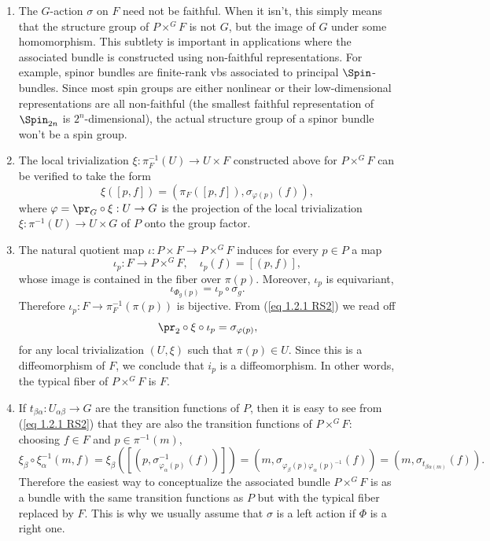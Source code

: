 \begin{rem}\label{rem 1.2.3 RS2}
    \begin{enumerate}
        \item The $G$-action $\sigma$ on $F$ need not be faithful. When it isn't, this simply means that the structure group of $P\times^G F$ is not $G$, but the image of $G$ under some homomorphism. This subtlety is important in applications where the associated bundle is constructed using non-faithful representations. For example, spinor bundles are finite-rank \glspl{vb} associated to principal $\Spin$-bundles. Since most spin groups are either nonlinear or their low-dimensional representations are all non-faithful (the smallest faithful representation of $\Spin_{2n}$ is $2^n$-dimensional), the actual structure group of a spinor bundle won't be a spin group.
        \item The local trivialization $\xi:\pi_F^{-1}(U)\to U\times F$ constructed above for $P\times^G F$ can be verified to take the form
        \[\xi([p,f])=(\pi_F([p,f]),\sigma_{\varphi(p)}(f)),\label{eq 1.2.1 RS2}\]
        where $\varphi=\pr_G\circ \xi:U\to G$ is the projection of the local trivialization $\xi:\pi^{-1}(U)\to U\times G$ of $P$ onto the group factor.
        \item The natural quotient map $\iota:P\times F\to P\times^G F$ induces for every $p\in P$ a map 
        \[\iota_p:F\to P\times^G F,\quad  \iota_p(f)=[(p,f)],\label{eq 1.2.2 RS2 def iotap}\]
        whose image is contained in the fiber over $\pi(p)$.  Moreover, $\iota_p$ is equivariant,
        \[\iota_{\Phi_g(p)}=\iota_p\circ \sigma_g.\label{eq 1.2.3 RS2}\]
        Therefore $\iota_p:F\to \pi_F^{-1}(\pi(p))$ is bijective.  From (\ref{eq 1.2.1 RS2}) we read off
        \[\pr_2\circ\xi\circ \iota_p=\sigma_{\varphi(p)},\]
        for any local trivialization $(U,\xi)$ such that $\pi(p)\in U$. Since this is a diffeomorphism of $F$, we conclude that $i_p$ is a diffeomorphism. In other words, the typical fiber of $P\times^G F$ is $F$.
        \item If $t_{\beta\alpha}:U_{\alpha\beta}\to G$ are the transition functions of $P$, then it is easy to see from (\ref{eq 1.2.1 RS2}) that they are also the transition functions of $P\times^G F$: choosing $f\in F$ and $p\in \pi^{-1}(m)$,
        \[\xi_\beta\circ\xi_{\alpha}^{-1}(m,f)=\xi_\beta([(p,\sigma_{\varphi_\alpha(p)}^{-1}(f))])=(m,\sigma_{\varphi_\beta(p)\varphi_\alpha(p)^{-1}}(f))=(m,\sigma_{t_{\beta\alpha(m)}}(f)).\]
        Therefore the easiest way to conceptualize the associated bundle $P\times^G F$ is as a bundle with the same transition functions as $P$ but with the typical fiber replaced by $F$. This is why we usually assume that $\sigma$ is a left action if $\Phi$ is a right one.
    \end{enumerate}
\end{rem}

